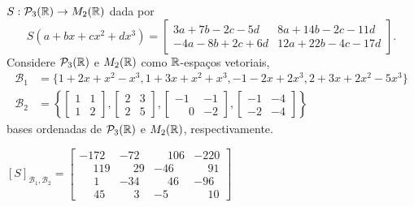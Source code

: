 \documentclass[12pt]{exam}
\begin{document}
\begin{exercicio}\label{fimmatriztransformacao}
    $S : \mathcal{P}_3(\mathbb{R}) \to M_2(\mathbb{R})$ dada por
    \[
    S(a + bx + cx^2 + dx^3) = \begin{bmatrix}
        3a + 7b - 2c - 5d & 8a + 14b - 2c - 11d\\
        -4a - 8b + 2c + 6d & 12a + 22b - 4c - 17d
    \end{bmatrix}.
    \]
    Considere $\mathcal{P}_3(\mathbb{R})$ e $M_2(\mathbb{R})$ como $\mathbb{R}$-espaços vetoriais,
    \begin{align*}
        \mathcal{B}_1 &= \{1 + 2x + x^2 - x^3, 1 + 3x + x^2 + x^3, -1 - 2x + 2x^3, 2 + 3x + 2x^2 - 5x^3\}\\
        \mathcal{B}_2 &= \left\{\begin{bmatrix}
            1 & 1\\1 & 2
        \end{bmatrix}, \begin{bmatrix}
            2 & 3\\2 & 5
        \end{bmatrix}, \begin{bmatrix}
            -1 & -1\\\phantom{-}0 & -2
        \end{bmatrix}, \begin{bmatrix}
            -1 & -4\\-2 & -4
        \end{bmatrix}\right\}
    \end{align*}
    bases ordenadas de $\mathcal{P}_3(\mathbb{R})$ e $M_2(\mathbb{R})$, respectivamente.

    \begin{solucao}
        $[S]_{\mathcal{B}_1, \mathcal{B}_2} = \begin{bmatrix}
            -172& -72 & \phantom{-}106 & -220\\
            \phantom{-}119 & \phantom{-}29 & -46 & \phantom{-}91\\
            \phantom{-1}1 & -34 & \phantom{-}46 & -96\\
            \phantom{-1}45 & \phantom{-1}3 & -5 & \phantom{-}10
        \end{bmatrix}$
    \end{solucao}
\end{exercicio}
\end{document}

